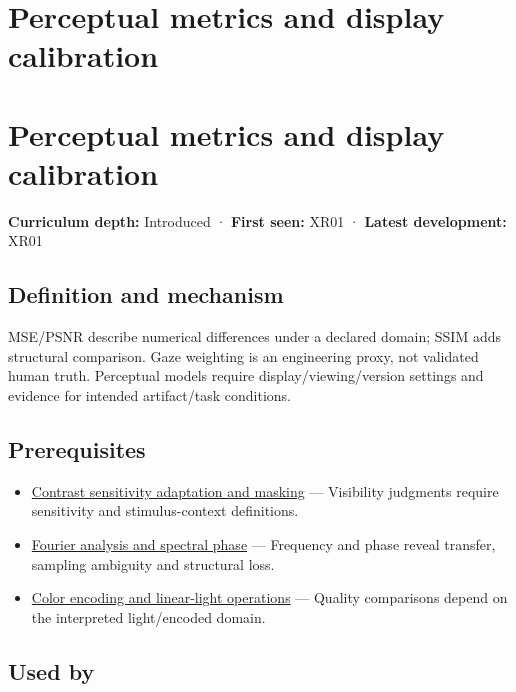 \hypertarget{appendix-b2c1846508bf}{}
\section*{Perceptual metrics and display calibration}
\section{Perceptual metrics and display calibration}\label{appendix-b2c1846508bf-perceptual-metrics-and-display-calibration}

\textbf{Curriculum depth:} Introduced · \textbf{First seen:} XR01 · \textbf{Latest development:} XR01

\subsection{Definition and mechanism}\label{appendix-b2c1846508bf-definition-and-mechanism}

MSE/PSNR describe numerical differences under a declared domain; SSIM adds structural comparison. Gaze weighting is an engineering proxy, not validated human truth. Perceptual models require display/viewing/version settings and evidence for intended artifact/task conditions.

\subsection{Prerequisites}\label{appendix-b2c1846508bf-prerequisites}

\begin{itemize}
\tightlist
\item
  \hyperref[appendix-b3aa9e8e01ad]{Contrast sensitivity adaptation and masking} --- Visibility judgments require sensitivity and stimulus-context definitions.
\item
  \hyperref[appendix-b60686ba06a1]{Fourier analysis and spectral phase} --- Frequency and phase reveal transfer, sampling ambiguity and structural loss.
\item
  \hyperref[appendix-a9f83ad40792]{Color encoding and linear-light operations} --- Quality comparisons depend on the interpreted light/encoded domain.
\end{itemize}

\subsection{Used by}\label{appendix-b2c1846508bf-used-by}

